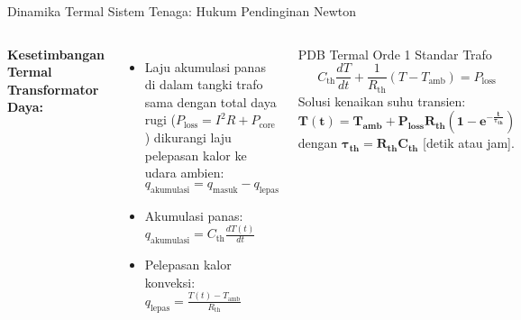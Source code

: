 \documentclass[aspectratio=169,10pt]{beamer}
\begin{document}
\begin{frame}{Dinamika Termal Sistem Tenaga: Hukum Pendinginan Newton}
  \begin{columns}[c]
    \textbf{Kesetimbangan Termal Transformator Daya:}
    \begin{itemize}
      \item Laju akumulasi panas di dalam tangki trafo sama dengan total daya rugi ($P_{\text{loss}} = I^2 R + P_{\text{core}}$) dikurangi laju pelepasan kalor ke udara ambien:
      \begin{equation}
        q_{\text{akumulasi}} = q_{\text{masuk}} - q_{\text{lepas}}
      \end{equation}
      \item Akumulasi panas: $q_{\text{akumulasi}} = C_{\text{th}} \frac{dT(t)}{dt}$
      \item Pelepasan kalor konveksi: $q_{\text{lepas}} = \frac{T(t) - T_{\text{amb}}}{R_{\text{th}}}$
    \end{itemize}

    \begin{block}{PDB Termal Orde 1 Standar Trafo}
      \begin{equation}
        C_{\text{th}} \frac{dT}{dt} + \frac{1}{R_{\text{th}}} (T - T_{\text{amb}}) = P_{\text{loss}}
      \end{equation}
      Solusi kenaikan suhu transien:
      \begin{equation*}
        \mathbf{T(t) = T_{\text{amb}} + P_{\text{loss}} R_{\text{th}} \left(1 - e^{-\frac{t}{\tau_{\text{th}}}}\right)}
      \end{equation*}
      dengan $\mathbf{\tau_{\text{th}} = R_{\text{th}} C_{\text{th}}}$ [detik atau jam].
    \end{block}
  \end{columns}
\end{frame}
\end{document}
